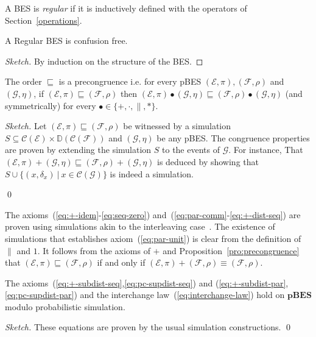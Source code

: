 \documentclass{llncs}
\newcommand{\pBES}{\mathbf{pBES}}
\newcommand{\C}{\mathcal{C}}
\newcommand{\D}{\mathbb{D}}
\newcommand{\EE}{\mathcal{E}}
\newcommand{\FF}{\mathcal{F}}
\newcommand{\G}{\mathcal{G}}
\newcommand{\refby}{\sqsubseteq}
\newcommand{\<}{\langle}
\renewcommand{\>}{\rangle}
\begin{document}
A BES is \textit{regular} if it is inductively defined with the operators of Section~\ref{operations}. 

\begin{proposition}\label{pro:confusion-free-regular}
A Regular BES is confusion free.
\end{proposition}

\begin{proof}[Sketch]
By induction on the structure of the BES.
\end{proof}

\begin{proposition}\label{pro:precongruence}
The order $\refby$ is a precongruence i.e. for every pBES $(\EE,\pi), (\FF,\rho)$ and $(\G,\eta)$, if $(\EE,\pi)\refby (\FF,\rho)$ then $(\EE,\pi)\bullet(\G,\eta)\refby (\FF,\rho)\bullet(\G,\eta)$ (and symmetrically) for every $\bullet\in\{+,\cdot,\|,*\}$. 
\end{proposition}

\begin{proof}[Sketch]
Let $(\EE,\pi)\refby(\FF,\rho)$ be witnessed by a simulation $S\subseteq\C(\EE)\times\D(\C(\FF))$ and $(\G,\eta)$ be any pBES. The congruence properties are proven by extending the simulation $S$ to the events of $\G$. For instance, That $(\EE,\pi) + (\G,\eta)\refby (\FF,\rho) + (\G,\eta)$ is deduced by showing that $S\cup\{(x,\delta_x)\ |\ x\in\C(\G)\}$ is indeed a simulation. 

\qed
\end{proof}


The axioms~(\ref{eq:+-idem}-\ref{eq:seq-zero}) and~(\ref{eq:par-comm}-\ref{eq:+-dist-seq}) are proven using simulations akin to the interleaving case~\cite{Rab13,Den07a}. The existence of simulations that establishes axiom~(\ref{eq:par-unit})  is clear from the definition of $\|$ and $1$. It follows from the axioms of $+$ and Proposition~\ref{pro:precongruence} that $(\EE,\pi)\refby (\FF,\rho)$ if and only if $(\EE,\pi) + (\FF,\rho)\equiv(\FF,\rho)$.

\begin{proposition}\label{pro:subdistributivity}
The axioms~(\ref{eq:+-subdist-seq},\ref{eq:pc-supdist-seq}) and (\ref{eq:+-subdist-par},\ref{eq:pc-supdist-par}) and the interchange law~(\ref{eq:interchange-law}) hold on $\pBES$ modulo probabilistic simulation.
\end{proposition}

\begin{proof}[Sketch]
These equations are proven by the usual simulation constructions.
\qed
\end{proof}
\end{document}
